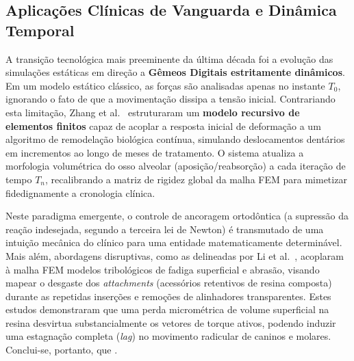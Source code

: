 \subsection{Aplicações Clínicas de Vanguarda e Dinâmica Temporal}

A transição tecnológica mais preeminente da última década foi a evolução das simulações estáticas em direção a \textbf{Gêmeos Digitais estritamente dinâmicos}. Em um modelo estático clássico, as forças são analisadas apenas no instante $T_0$, ignorando o fato de que a movimentação dissipa a tensão inicial. Contrariando esta limitação, Zhang et al.~\cite{zhang2024recursive} estruturaram um \textbf{modelo recursivo de elementos finitos} capaz de acoplar a resposta inicial de deformação a um algoritmo de remodelação biológica contínua, simulando deslocamentos dentários em incrementos ao longo de meses de tratamento. O sistema atualiza a morfologia volumétrica do osso alveolar (aposição/reabsorção) a cada iteração de tempo $T_n$, recalibrando a matriz de rigidez global da malha FEM para mimetizar fidedignamente a cronologia clínica.

Neste paradigma emergente, o controle de ancoragem ortodôntica (a supressão da reação indesejada, segundo a terceira lei de Newton) é transmutado de uma intuição mecânica do clínico para uma entidade matematicamente determinável. Mais além, abordagens disruptivas, como as delineadas por Li et al.~\cite{li2025impacts}, acoplaram à malha FEM modelos tribológicos de fadiga superficial e abrasão, visando mapear o desgaste dos \textit{attachments} (acessórios retentivos de resina composta) durante as repetidas inserções e remoções de alinhadores transparentes. Estes estudos demonstraram que uma perda micrométrica de volume superficial na resina desvirtua substancialmente os vetores de torque ativos, podendo induzir uma estagnação completa (\textit{lag}) no movimento radicular de caninos e molares. Conclui-se, portanto, que .
